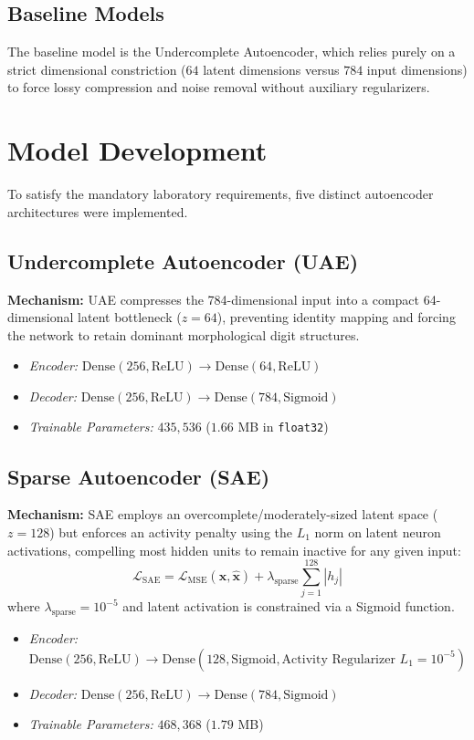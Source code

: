 \documentclass[12pt, a4paper]{article}
\begin{document}
\subsection{Baseline Models}
The baseline model is the Undercomplete Autoencoder, which relies purely on a strict dimensional constriction ($64$ latent dimensions versus $784$ input dimensions) to force lossy compression and noise removal without auxiliary regularizers.


\section{Model Development}

To satisfy the mandatory laboratory requirements, five distinct autoencoder architectures were implemented.

\subsection{Undercomplete Autoencoder (UAE)}
\textbf{Mechanism:} UAE compresses the 784-dimensional input into a compact 64-dimensional latent bottleneck ($z=64$), preventing identity mapping and forcing the network to retain dominant morphological digit structures.
\begin{itemize}[noitemsep]
    \item \textit{Encoder:} $\text{Dense}(256, \text{ReLU}) \to \text{Dense}(64, \text{ReLU})$
    \item \textit{Decoder:} $\text{Dense}(256, \text{ReLU}) \to \text{Dense}(784, \text{Sigmoid})$
    \item \textit{Trainable Parameters:} $435,536$ ($1.66$ MB in \texttt{float32})
\end{itemize}

\subsection{Sparse Autoencoder (SAE)}
\textbf{Mechanism:} SAE employs an overcomplete/moderately-sized latent space ($z = 128$) but enforces an activity penalty using the $L_1$ norm on latent neuron activations, compelling most hidden units to remain inactive for any given input:
\begin{equation}
    \mathcal{L}_{\text{SAE}} = \mathcal{L}_{\text{MSE}}(\mathbf{x}, \hat{\mathbf{x}}) + \lambda_{\text{sparse}} \sum_{j=1}^{128} |h_j|
\end{equation}
where $\lambda_{\text{sparse}} = 10^{-5}$ and latent activation is constrained via a Sigmoid function.
\begin{itemize}[noitemsep]
    \item \textit{Encoder:} $\text{Dense}(256, \text{ReLU}) \to \text{Dense}(128, \text{Sigmoid}, \text{Activity Regularizer } L_1=10^{-5})$
    \item \textit{Decoder:} $\text{Dense}(256, \text{ReLU}) \to \text{Dense}(784, \text{Sigmoid})$
    \item \textit{Trainable Parameters:} $468,368$ ($1.79$ MB)
\end{itemize}
\end{document}
